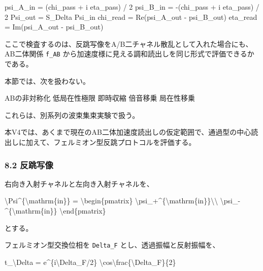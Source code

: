 \documentclass[
]{article}
\newenvironment{Shaded}{}{}
\newcommand{\NormalTok}[1]{#1}
\begin{document}
\begin{Shaded}
\begin{Highlighting}[]
\NormalTok{psi\_A\_in =  (chi\_pass + i eta\_pass) / 2}
\NormalTok{psi\_B\_in = {-}(chi\_pass + i eta\_pass) / 2}
\NormalTok{Psi\_out  = S\_Delta Psi\_in}
\NormalTok{chi\_read = Re(psi\_A\_out {-} psi\_B\_out)}
\NormalTok{eta\_read = Im(psi\_A\_out {-} psi\_B\_out)}
\end{Highlighting}
\end{Shaded}

ここで検査するのは、反跳写像をA/B二チャネル散乱として入れた場合にも、AB二体関係
\texttt{f\_AB}
から加速度様に見える調和読出しを同じ形式で評価できるかである。

本節では、次を扱わない。

\begin{Shaded}
\begin{Highlighting}[]
\NormalTok{ABの非対称化}
\NormalTok{低局在性極限}
\NormalTok{即時収縮}
\NormalTok{倍音移乗}
\NormalTok{局在性移乗}
\end{Highlighting}
\end{Shaded}

これらは、別系列の波束集束実験で扱う。

本V4では、あくまで現在のAB二体加速度読出しの仮定範囲で、通過型の中心読出しに加えて、フェルミオン型反跳プロトコルを評価する。

\subsubsection{8.2 反跳写像}\label{ux53cdux8df3ux5199ux50cf}

右向き入射チャネルと左向き入射チャネルを、

\begin{Shaded}
\begin{Highlighting}[]
\NormalTok{\textbackslash{}Psi\^{}\{\textbackslash{}mathrm\{in\}\}}
\NormalTok{=}
\NormalTok{\textbackslash{}begin\{pmatrix\}}
\NormalTok{\textbackslash{}psi\_+\^{}\{\textbackslash{}mathrm\{in\}\}\textbackslash{}\textbackslash{}}
\NormalTok{\textbackslash{}psi\_{-}\^{}\{\textbackslash{}mathrm\{in\}\}}
\NormalTok{\textbackslash{}end\{pmatrix\}}
\end{Highlighting}
\end{Shaded}

とする。

フェルミオン型交換位相を \texttt{Delta\_F} とし、透過振幅と反射振幅を、

\begin{Shaded}
\begin{Highlighting}[]
\NormalTok{t\_\textbackslash{}Delta}
\NormalTok{=}
\NormalTok{e\^{}\{i\textbackslash{}Delta\_F/2\}}
\NormalTok{\textbackslash{}cos\textbackslash{}frac\{\textbackslash{}Delta\_F\}\{2\}}
\end{Highlighting}
\end{Shaded}
\end{document}
